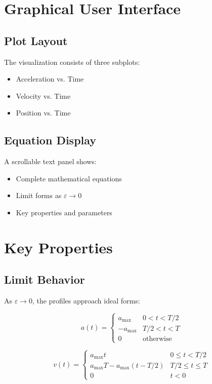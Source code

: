 \documentclass[12pt,a4paper]{article}
\begin{document}
\section{Graphical User Interface}

\subsection{Plot Layout}
The visualization consists of three subplots:
\begin{itemize}
\item Acceleration vs. Time
\item Velocity vs. Time
\item Position vs. Time
\end{itemize}

\subsection{Equation Display}
A scrollable text panel shows:
\begin{itemize}
\item Complete mathematical equations
\item Limit forms as $\varepsilon \to 0$
\item Key properties and parameters
\end{itemize}

\section{Key Properties}

\subsection{Limit Behavior}
As $\varepsilon \to 0$, the profiles approach ideal forms:

\begin{equation}
a(t) = \begin{cases}
a_{\text{max}} & 0 < t < T/2 \\
-a_{\text{max}} & T/2 < t < T \\
0 & \text{otherwise}
\end{cases}
\end{equation}

\begin{equation}
v(t) = \begin{cases}
a_{\text{max}}t & 0 \leq t < T/2 \\
a_{\text{max}}T - a_{\text{max}}(t-T/2) & T/2 \leq t \leq T \\
0 & t < 0
\end{cases}
\end{equation}
\end{document}

